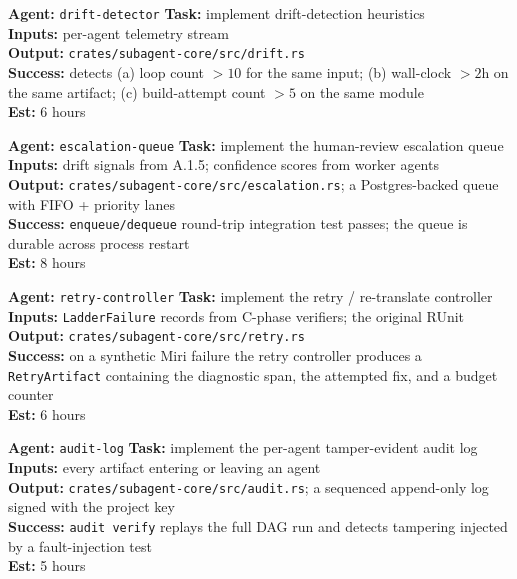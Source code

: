 \documentclass[12pt]{article}
\theoremstyle{definition}
\theoremstyle{remark}
\newenvironment{tasklist}{%
  \begingroup\raggedright
  \begin{description}[style=nextline, leftmargin=1.4cm, itemsep=0.4em]
}{%
  \end{description}
  \endgroup
}
\begin{document}
\begin{tasklist}
\item[\textbf{Task A.1.5}] \textbf{Agent:} \texttt{drift-detector} \quad
  \textbf{Task:} implement drift-detection heuristics\\
  \textbf{Inputs:} per-agent telemetry stream\\
  \textbf{Output:} \texttt{crates/subagent-core/src/drift.rs}\\
  \textbf{Success:} detects (a) loop count $> 10$ for the same input;
  (b) wall-clock $> 2$h on the same artifact; (c) build-attempt count
  $> 5$ on the same module\\
  \textbf{Est:} 6 hours

\item[\textbf{Task A.1.6}] \textbf{Agent:} \texttt{escalation-queue} \quad
  \textbf{Task:} implement the human-review escalation queue\\
  \textbf{Inputs:} drift signals from A.1.5; confidence scores from
  worker agents\\
  \textbf{Output:} \texttt{crates/subagent-core/src/escalation.rs}; a
  Postgres-backed queue with FIFO + priority lanes\\
  \textbf{Success:} \texttt{enqueue/dequeue} round-trip integration
  test passes; the queue is durable across process restart\\
  \textbf{Est:} 8 hours

\item[\textbf{Task A.1.7}] \textbf{Agent:} \texttt{retry-controller} \quad
  \textbf{Task:} implement the retry / re-translate controller\\
  \textbf{Inputs:} \texttt{LadderFailure} records from C-phase
  verifiers; the original RUnit\\
  \textbf{Output:} \texttt{crates/subagent-core/src/retry.rs}\\
  \textbf{Success:} on a synthetic Miri failure the retry controller
  produces a \texttt{RetryArtifact} containing the diagnostic span,
  the attempted fix, and a budget counter\\
  \textbf{Est:} 6 hours

\item[\textbf{Task A.1.8}] \textbf{Agent:} \texttt{audit-log} \quad
  \textbf{Task:} implement the per-agent tamper-evident audit log\\
  \textbf{Inputs:} every artifact entering or leaving an agent\\
  \textbf{Output:} \texttt{crates/subagent-core/src/audit.rs}; a
  sequenced append-only log signed with the project key\\
  \textbf{Success:} \texttt{audit verify} replays the full DAG run and
  detects tampering injected by a fault-injection test\\
  \textbf{Est:} 5 hours
\end{tasklist}
\end{document}
